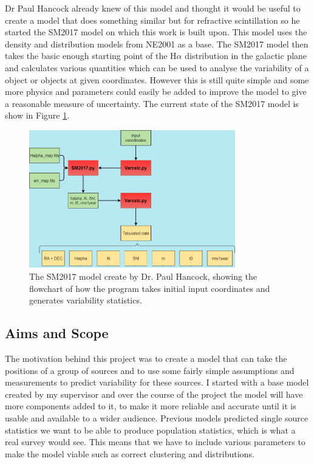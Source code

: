 \documentclass[10pt,a4paper]{article}
\begin{document}
Dr Paul Hancock already knew of this model and thought it would be useful to create a model that does something similar but for refractive scintillation so he started the SM2017 model on which this work is built upon. This model uses the density and distribution models from NE2001 as a base. The SM2017 model then takes the basic enough starting point of the H$\alpha$ distribution in the galactic plane and calculates various quantities which can be used to analyse the variability of a object or objects at given coordinates. However this is still quite simple and some more physics and parameters could easily be added to improve the model to give a reasonable measure of uncertainty. The current state of the SM2017 model is show in Figure \ref{SM2017}.
\begin{figure}[H]
\begin{center}
	\includegraphics[width=0.8\textwidth]{SM2017_old}
	\caption{The SM2017 model create by Dr. Paul Hancock, showing the flowchart of how the program takes initial input coordinates and generates variability statistics.}
	\label{SM2017}
\end{center}
\end{figure}
\subsection{Aims and Scope}
The motivation behind this project was to create a model that can take the positions of a group of sources and to use some fairly simple assumptions and measurements to predict variability for these sources. I started with a base model created by my supervisor and over the course of the project the model will have more components added to it, to make it more reliable and accurate until it is usable and available to a wider audience. Previous models predicted single source statistics we want to be able to produce population statistics, which is what a real survey would see. This means that we have to include various parameters to make the model viable such as correct clustering and distributions.\\
\end{document}
